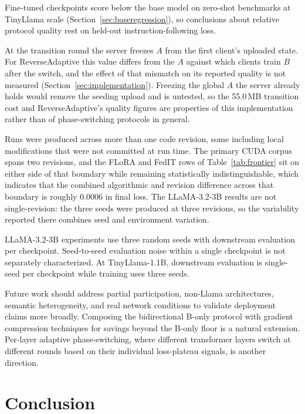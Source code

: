 Fine-tuned checkpoints score below the base model on zero-shot benchmarks at TinyLlama scale (Section~\ref{sec:baseregression}), so conclusions about relative protocol quality rest on held-out instruction-following loss.

At the transition round the server freezes $A$ from the first client's uploaded state. For ReverseAdaptive this value differs from the $A$ against which clients train $B$ after the switch, and the effect of that mismatch on its reported quality is not measured (Section~\ref{sec:implementation}). Freezing the global $A$ the server already holds would remove the seeding upload and is untested, so the 55.0\,MB transition cost and ReverseAdaptive's quality figures are properties of this implementation rather than of phase-switching protocols in general.

Runs were produced across more than one code revision, some including local modifications that were not committed at run time. The primary CUDA corpus spans two revisions, and the FLoRA and FedIT rows of Table~\ref{tab:frontier} sit on either side of that boundary while remaining statistically indistinguishable, which indicates that the combined algorithmic and revision difference across that boundary is roughly 0.0006 in final loss. The LLaMA-3.2-3B results are not single-revision: the three seeds were produced at three revisions, so the variability reported there combines seed and environment variation.

LLaMA-3.2-3B experiments use three random seeds with downstream evaluation per checkpoint. Seed-to-seed evaluation noise within a single checkpoint is not separately characterized. At TinyLlama-1.1B, downstream evaluation is single-seed per checkpoint while training uses three seeds.

Future work should address partial participation, non-Llama architectures, semantic heterogeneity, and real network conditions to validate deployment claims more broadly. Composing the bidirectional B-only protocol with gradient compression techniques \cite{alistarh2017qsgd,lin2017deep} for savings beyond the B-only floor is a natural extension. Per-layer adaptive phase-switching, where different transformer layers switch at different rounds based on their individual loss-plateau signals, is another direction.

\section{Conclusion}
\label{sec:conclusion}

